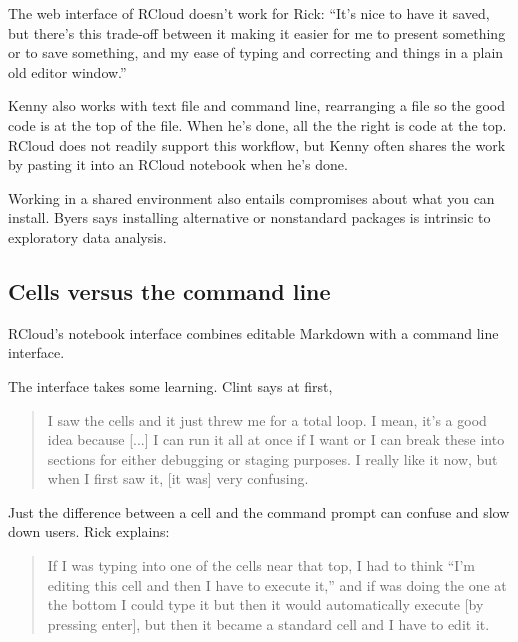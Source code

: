 The web interface of RCloud doesn't work for Rick: ``It's nice to have
it saved, but there's this trade-off between it making it easier for me to
present something or to save something, and my ease of typing and
correcting and things in a plain old editor window.''

Kenny also works with text file and command line, rearranging a file so the
good code is at the top of the file. When he's done, all the the right is
code at the top. RCloud does not readily support this workflow, but Kenny
often shares the work by pasting it into an RCloud notebook when he's done.


Working in a shared environment also entails compromises about what you can
install. Byers says installing alternative or nonstandard packages is
intrinsic to exploratory data analysis.

\subsection{Cells versus the command line}
RCloud's notebook interface combines editable Markdown with a command line
interface.

The interface takes some learning. Clint says at first,
\begin{quote}
I saw the cells and it just threw me
for a total loop. I mean, it's a good idea because [...] I can run it all at
once if I want or I can break these into sections for either debugging or
staging purposes. I really like it now, but when I first saw it, [it was] very
confusing.
\end{quote}

Just the difference between a cell and the command prompt can confuse and slow
down users. Rick explains:
\begin{quote}
If I was typing into one of the cells near that top, I had
to think ``I'm editing this cell and then I have to execute it,'' and if was doing
the one at the bottom I could type it but then it would automatically execute
[by pressing enter], but then it became a standard cell and I have to edit
it.
\end{quote}

